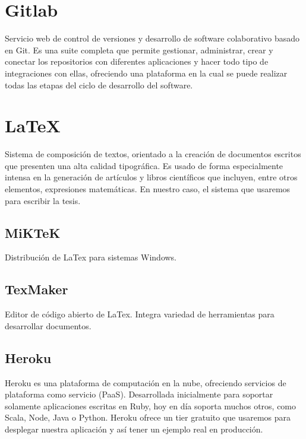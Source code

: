 \section{Gitlab}
Servicio web de control de versiones y desarrollo de software colaborativo basado en Git. Es una suite completa que permite gestionar, administrar, crear y conectar los repositorios con diferentes aplicaciones y hacer todo tipo de integraciones con ellas, ofreciendo una plataforma en la cual se puede realizar todas las etapas del ciclo de desarrollo del software.

\section{LaTeX}
Sistema de composición de textos, orientado a la creación de documentos escritos que presenten una alta calidad tipográfica. Es usado de forma especialmente intensa en la generación de artículos y libros científicos que incluyen, entre otros elementos, expresiones matemáticas. En nuestro caso, el sistema que usaremos para escribir la tesis.

\subsection{MiKTeK}
Distribución de LaTex para sistemas Windows.

\subsection{TexMaker}
Editor de código abierto de LaTex. Integra variedad de herramientas para desarrollar documentos.

\subsection{Heroku}
Heroku es una plataforma de computación en la nube, ofreciendo servicios de plataforma como servicio (PaaS). Desarrollada inicialmente para soportar solamente aplicaciones escritas en Ruby, hoy en día soporta muchos otros, como Scala, Node, Java o Python. Heroku ofrece un tier gratuito que usaremos para desplegar nuestra aplicación y así tener un ejemplo real en producción.
